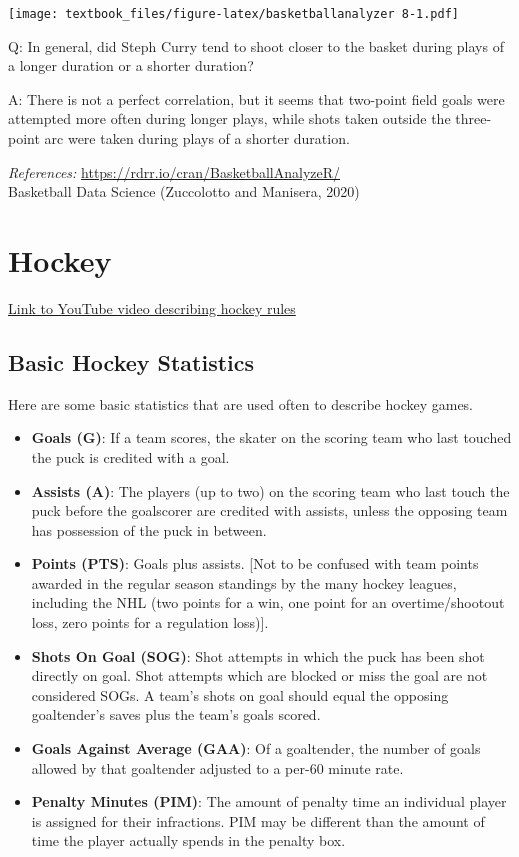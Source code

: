 \documentclass[
  11pt,
]{book}
\theoremstyle{definition}
\theoremstyle{definition}
\theoremstyle{definition}
\theoremstyle{definition}
\theoremstyle{remark}
\begin{document}
\texttt{[image: textbook\_files/figure-latex/basketballanalyzer 8-1.pdf]}

Q: In general, did Steph Curry tend to shoot closer to the basket during plays of a longer duration or a shorter duration?

A: There is not a perfect correlation, but it seems that two-point field goals were attempted more often during longer plays, while shots taken outside the three-point arc were taken during plays of a shorter duration.

\emph{References:}
\url{https://rdrr.io/cran/BasketballAnalyzeR/}\\
Basketball Data Science (Zuccolotto and Manisera, 2020)

\newpage

\hypertarget{hockey}{%
\section{Hockey}\label{hockey}}

\href{https://www.youtube.com/watch?v=nv2FUnHceqU}{Link to YouTube video describing hockey rules}

\hypertarget{basic-hockey-statistics}{%
\subsection{Basic Hockey Statistics}\label{basic-hockey-statistics}}

Here are some basic statistics that are used often to describe hockey games.

\begin{itemize}
\item
  \textbf{Goals (G)}: If a team scores, the skater on the scoring team who last touched the puck is credited with a goal.
\item
  \textbf{Assists (A)}: The players (up to two) on the scoring team who last touch the puck before the goalscorer are credited with assists, unless the opposing team has possession of the puck in between.
\item
  \textbf{Points (PTS)}: Goals plus assists. {[}Not to be confused with team points awarded in the regular season standings by the many hockey leagues, including the NHL (two points for a win, one point for an overtime/shootout loss, zero points for a regulation loss){]}.
\item
  \textbf{Shots On Goal (SOG)}: Shot attempts in which the puck has been shot directly on goal. Shot attempts which are blocked or miss the goal are not considered SOGs. A team's shots on goal should equal the opposing goaltender's saves plus the team's goals scored.
\item
  \textbf{Goals Against Average (GAA)}: Of a goaltender, the number of goals allowed by that goaltender adjusted to a per-60 minute rate.
\item
  \textbf{Penalty Minutes (PIM)}: The amount of penalty time an individual player is assigned for their infractions. PIM may be different than the amount of time the player actually spends in the penalty box.
\end{itemize}
\end{document}
